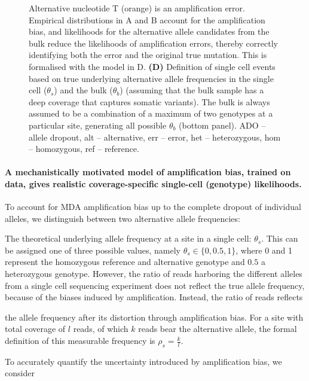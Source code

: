 \documentclass[fleqn,12pt,inline]{wlscirep}
\begin{document}
\begin{figure}[!tpb]
{   Alternative nucleotide T (orange) is an amplification error.
   Empirical distributions in A and B account for the  amplification bias, and likelihoods for the alternative allele candidates from the bulk reduce the likelihoods of amplification errors, thereby correctly identifying both the error and the original true mutation.
   This is formalised with the model in D.
   \textbf{(D)} Definition of single cell events based on true underlying alternative allele frequencies in the single cell ($\theta_s$) and the bulk ($\theta_b$) (assuming that the bulk sample has a deep coverage that captures somatic variants).
   The bulk is always assumed to be a combination of a maximum of two genotypes at a particular site, generating all possible $\theta_b$ (bottom panel).\small\newline
   ADO -- allele dropout, alt -- alternative, err -- error, het -- heterozygous, hom -- homozygous, ref -- reference.}
  \label{fig:prosolo_alt-calling}
\end{figure}

\paragraph{A mechanistically motivated model of amplification bias, trained on data, gives realistic coverage-specific single-cell (genotype) likelihoods.}
To account for MDA amplification bias up to the complete dropout of individual alleles, we distinguish between two alternative allele frequencies:
\begin{enumerate*}[label={(\roman*)}]
  \item The theoretical underlying allele frequency at a site in a single cell: $\theta_s$.
   This can be assigned one of three possible values, namely $\theta_s\in\{0,0.5,1\}$, where 0 and 1 represent the homozygous reference and alternative genotype and $0.5$ a heterozygous genotype.
   However, the ratio of reads harboring the different alleles from a single cell sequencing experiment does not reflect the true allele frequency, because of the biases induced by amplification. 
  Instead, the ratio of reads reflects
  \item the allele frequency after its distortion through amplification bias.
   For a site with total coverage of $l$ reads, of which $k$ reads bear the alternative allele, the formal definition of this measurable frequency is $\rho_s=\frac{k}{l}$.
\end{enumerate*}
To accurately quantify the uncertainty introduced by amplification bias, we consider  
\end{document}
